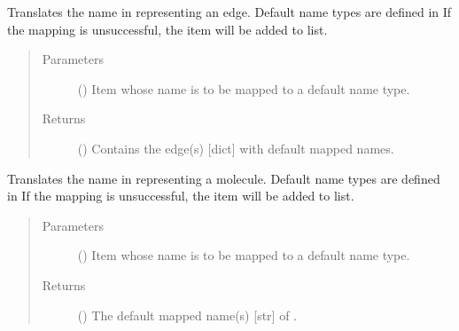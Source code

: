 \documentclass[letterpaper,10pt,english]{sphinxmanual}
\begin{document}
\begin{fulllineitems}
\begin{fulllineitems}
\label{\detokenize{main:pypath.main.PyPath.map_edge}}
Translates the name in  representing an edge. Default
name types are defined in
 If the mapping
is unsuccessful, the item will be added to
 list.
\begin{quote}\begin{description}
\item[{Parameters}] \leavevmode
{} () \textendash{} Item whose name is to be mapped to a default name type.

\item[{Returns}] \leavevmode
() \textendash{} Contains the edge(s) {[}dict{]} with default mapped
names.

\end{description}\end{quote}

\end{fulllineitems}


\begin{fulllineitems}
\label{\detokenize{main:pypath.main.PyPath.map_item}}
Translates the name in  representing a molecule. Default
name types are defined in
 If the mapping
is unsuccessful, the item will be added to
 list.
\begin{quote}\begin{description}
\item[{Parameters}] \leavevmode
{} () \textendash{} Item whose name is to be mapped to a default name type.

\item[{Returns}] \leavevmode
() \textendash{} The default mapped name(s) {[}str{]} of .

\end{description}\end{quote}


\end{fulllineitems}
\end{fulllineitems}
\end{document}
